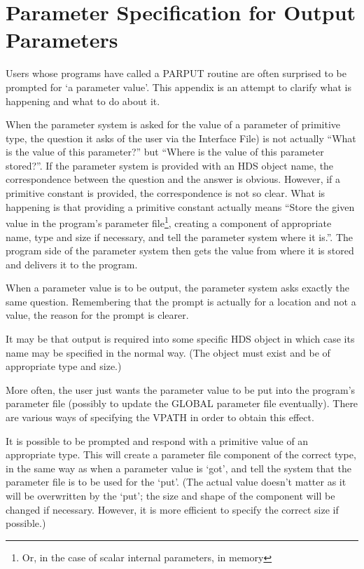 \documentclass[twoside,11pt]{article}
\newcommand{\xlabel}[1]{}
\renewcommand{\_}{\texttt{\symbol{95}}}
\begin{document}
\newpage

\section{Parameter Specification for Output Parameters
\xlabel{parameter_specification_for_output_parameters}\label{output}}

Users whose programs have called a PAR\_PUT routine are often surprised
to be prompted for `a parameter value'.
This appendix is an attempt to clarify what is happening and what to do about
it.

When the parameter system is asked for the value of a parameter of primitive
type, the question it asks of the user via the Interface File) is not
actually ``What is the value of this parameter?'' but ``Where is the value of
this parameter stored?''.
If the parameter system is provided with an HDS object name, the
correspondence between the question and the answer is obvious.
However, if a primitive constant is provided, the correspondence is not so
clear.
What is happening is that providing a primitive constant actually
means ``Store the given value in the program's parameter file\footnote{Or, in
the case of scalar internal parameters, in memory},
creating a component of appropriate name, type and size if necessary, and tell
the parameter system where it is.''.
The program side of the parameter system then gets the value from where it
is stored and delivers it to the program.

When a parameter value is to be output, the parameter system asks exactly the
same question.
Remembering that the prompt is actually for a location and not a value,
the reason for the prompt is clearer.

It may be that output is required into some specific HDS object in which case
its name may be specified in the normal way.
(The object must exist and be of appropriate type and size.)

More often, the user just wants the parameter value to be put into the
program's parameter file (possibly to update the GLOBAL parameter file
eventually).
There are various ways of specifying the VPATH in order to obtain this effect.

It is possible to be prompted and respond with a primitive value
of an appropriate type.
This will create a parameter file component of the correct type, in
the same way as when a parameter value is `got', and tell the system that
the parameter file is to be used for the `put'.
(The actual value doesn't matter as it will be overwritten by the `put';
the size and shape of the component will be changed if necessary. However,
it is more efficient to specify the correct size if possible.)
\end{document}
